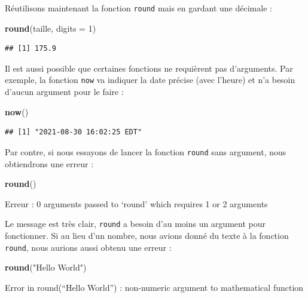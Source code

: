 \documentclass[
  11pt,
  french,
]{book}
\makeatletter
\newenvironment{Shaded}{\begin{snugshade}}{\end{snugshade}}
\newcommand{\DataTypeTok}[1]{\textcolor[rgb]{0.13,0.29,0.53}{#1}}
\newcommand{\DecValTok}[1]{\textcolor[rgb]{0.00,0.00,0.81}{#1}}
\newcommand{\KeywordTok}[1]{\textcolor[rgb]{0.13,0.29,0.53}{\textbf{#1}}}
\newcommand{\NormalTok}[1]{#1}
\newcommand{\StringTok}[1]{\textcolor[rgb]{0.31,0.60,0.02}{#1}}
\newenvironment{kframe}{%
\medskip{}
\setlength{\fboxsep}{.8em}
 \def\at@end@of@kframe{}%
 \ifinner\ifhmode%
  \def\at@end@of@kframe{\end{minipage}}%
  \begin{minipage}{\columnwidth}%
 \fi\fi%
 \def\FrameCommand##1{\hskip\@totalleftmargin \hskip-\fboxsep
 \colorbox{shadecolor}{##1}\hskip-\fboxsep
     \hskip-\linewidth \hskip-\@totalleftmargin \hskip\columnwidth}%
 \MakeFramed {\advance\hsize-\width
   \@totalleftmargin\z@ \linewidth\hsize
   \@setminipage}}%
 {\par\unskip\endMakeFramed%
 \at@end@of@kframe}
\renewenvironment{Shaded}{\begin{kframe}}{\end{kframe}}
\makeatother
\begin{document}
Réutilisons maintenant la fonction \texttt{round} mais en gardant une décimale :

\begin{Shaded}
\begin{Highlighting}[]
\KeywordTok{round}\NormalTok{(taille, }\DataTypeTok{digits =} \DecValTok{1}\NormalTok{)}
\end{Highlighting}
\end{Shaded}

\begin{verbatim}
## [1] 175.9
\end{verbatim}

Il est aussi possible que certaines fonctions ne requièrent pas d'arguments. Par exemple, la fonction \texttt{now} va indiquer la date précise (avec l'heure) et n'a besoin d'aucun argument pour le faire :

\begin{Shaded}
\begin{Highlighting}[]
\KeywordTok{now}\NormalTok{()}
\end{Highlighting}
\end{Shaded}

\begin{verbatim}
## [1] "2021-08-30 16:02:25 EDT"
\end{verbatim}

Par contre, si nous essayons de lancer la fonction \texttt{round} sans argument, nous obtiendrons une erreur :

\begin{Shaded}
\begin{Highlighting}[]
\KeywordTok{round}\NormalTok{()}
\end{Highlighting}
\end{Shaded}

{Erreur : 0 arguments passed to `round' which requires 1 or 2 arguments}

Le message est très clair, \texttt{round} a besoin d'au moins un argument pour fonctionner. Si au lieu d'un nombre, nous avions donné du texte à la fonction \texttt{round}, nous aurions aussi obtenu une erreur :

\begin{Shaded}
\begin{Highlighting}[]
\KeywordTok{round}\NormalTok{(}\StringTok{"Hello World"}\NormalTok{)}
\end{Highlighting}
\end{Shaded}

{Error in round(``Hello World'') :
non-numeric argument to mathematical function}
\end{document}
